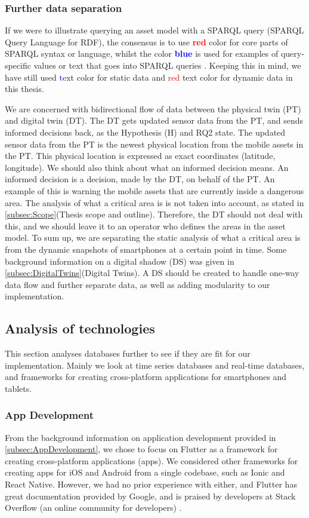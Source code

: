 \documentclass{article}
\begin{document}
\subsubsection{Further data separation}
If we were to illustrate querying an asset model with a SPARQL query (SPARQL Query Language for RDF), the consensus is to use \textbf{\textcolor{red}{red}} color for core parts of SPARQL syntax or language, whilst the color \textbf{\textcolor{blue}{blue}} is used for examples of query-specific values or text that goes into SPARQL queries \cite{noauthor_sparql_nodate}. Keeping this in mind, we have still used \textcolor{blue} text color for static data and \textcolor{red}{red} text color for dynamic data in this thesis. 

We are concerned with bidirectional flow of data between the physical twin (PT) and digital twin (DT). The DT gets updated sensor data from the PT, and sends informed decisions back, as the Hypothesis (H) and RQ2 state. The updated sensor data from the PT is the newest physical location from the mobile assets in the PT. This physical location is expressed as exact coordinates (latitude, longitude). We should also think about what an informed decision means. An informed decision is a decision, made by the DT, on behalf of the PT. An example of this is warning the mobile assets that are currently inside a dangerous area. The analysis of what a critical area is is not taken into account, as stated in \ref{subsec:Scope}(Thesis scope and outline). Therefore, the DT should not deal with this, and we should leave it to an operator who defines the areas in the asset model. To sum up, we are separating the static analysis of what a critical area is from the dynamic snapshots of smartphones at a certain point in time. Some background information on a digital shadow (DS) was given in \ref{subsec:DigitalTwins}(Digital Twins). A DS should be created to handle one-way data flow and further separate data, as well as adding modularity to our implementation.

\subsection{Analysis of technologies}
This section analyses databases further to see if they are fit for our implementation. Mainly we look at time series databases and real-time databases, and frameworks for creating cross-platform applications for smartphones and tablets.

\subsubsection{App Development}
From the background information on application development provided in \ref{subsec:AppDevelopment}, we chose to focus on Flutter as a framework for creating cross-platform applications (apps). We considered other frameworks for creating apps for iOS and Android from a single codebase, such as Ionic and React Native. However, we had no prior experience with either, and Flutter has great documentation provided by Google, and is praised by developers at Stack Overflow (an online community for developers) \cite{noauthor_why_nodate}.
\end{document}
